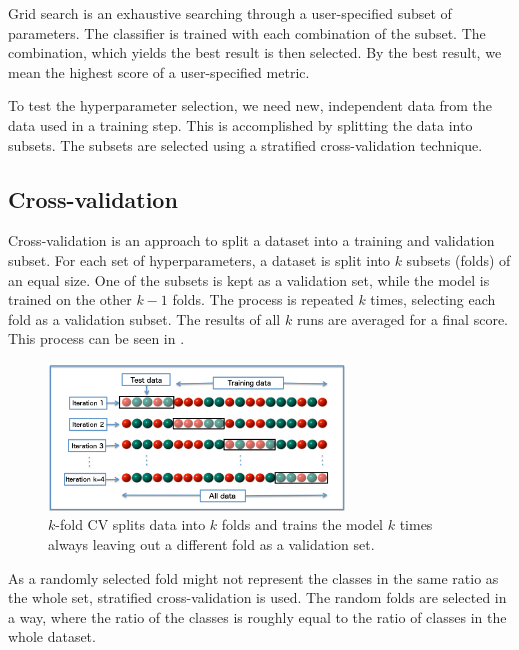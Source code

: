 Grid search is an exhaustive searching through a user-specified subset of parameters. The classifier is trained with each combination of the subset. The combination, which yields the best result is then selected. By the best result, we mean the highest score of a user-specified metric.

To test the hyperparameter selection, we need new, independent data from the data used in a training step. This is accomplished by splitting the data into subsets. The subsets are selected using a stratified cross-validation technique.

\subsection{Cross-validation}
Cross-validation is an approach to split a dataset into a training and validation subset. For each set of hyperparameters, a dataset is split into $k$ subsets (folds) of an equal size. One of the subsets is kept as a validation set, while the model is trained on the other $k-1$ folds. The process is repeated $k$ times, selecting each fold as a validation subset. The results of all $k$ runs are averaged for a final score. This process can be seen in .
\begin{figure}
    \centering
    \includegraphics[width=0.7\textwidth]{Figures/svm/k-fold.jpg}
    \caption[$k$-fold CV splits data into $k$ folds and trains the model $k$ times always leaving out a different fold as a validation set.]{$k$-fold CV splits data into $k$ folds and trains the model $k$ times always leaving out a different fold as a validation set. \cite{crossval}}
    \label{fig:k-fold}
\end{figure}

As a randomly selected fold might not represent the classes in the same ratio as the whole set, stratified cross-validation is used. The random folds are selected in a way, where the ratio of the classes is roughly equal to the ratio of classes in the whole dataset.
